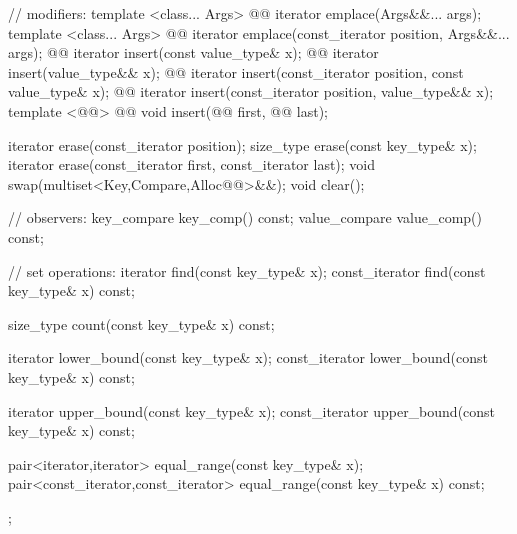 \documentclass[american,twoside]{book}
\begin{document}
\begin{codeblock}
{{    // modifiers:
    template <class... Args> 
      @@
      iterator emplace(Args&&... args);
    template <class... Args> 
      @@
      iterator emplace(const_iterator position, Args&&... args);
    @@ 
      iterator insert(const value_type& x);
    @@ 
      iterator insert(value_type&& x);
    @@ 
      iterator insert(const_iterator position, const value_type& x);
    @@ 
      iterator insert(const_iterator position, value_type&& x);
    template <@@>
      @@
      void insert(@@ first, @@ last);

    iterator  erase(const_iterator position);
    size_type erase(const key_type& x);
    iterator  erase(const_iterator first, const_iterator last);
    void swap(multiset<Key,Compare,Alloc@@>&&);
    void clear();

    // observers:
    key_compare   key_comp() const;
    value_compare value_comp() const;

    // set operations:
    iterator        find(const key_type& x);
    const_iterator  find(const key_type& x) const;

    size_type count(const key_type& x) const;

    iterator        lower_bound(const key_type& x);
    const_iterator  lower_bound(const key_type& x) const;

    iterator        upper_bound(const key_type& x);
    const_iterator  upper_bound(const key_type& x) const;

    pair<iterator,iterator>             equal_range(const key_type& x);
    pair<const_iterator,const_iterator> equal_range(const key_type& x) const;
  };

}
\end{codeblock}
\end{document}
